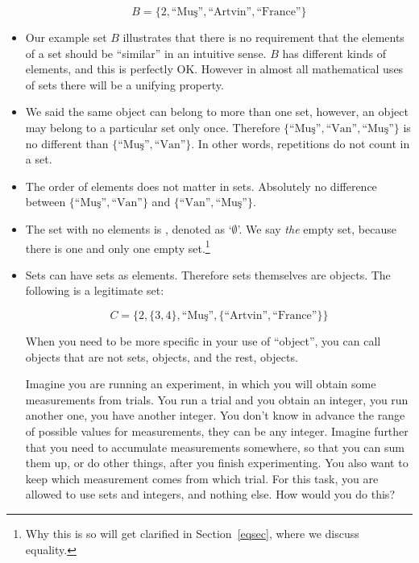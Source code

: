 \documentclass[11pt]{article}
\begin{document}
\begin{itemize}
\[
B=\{2,\text{``Mu\c s''},\text{``Artvin''}, \text{``France''}\}
\]

\item Our example set $B$ illustrates that there is no
requirement that the elements of a set should be ``similar'' in an intuitive
sense. $B$ has different kinds of elements, and this is perfectly OK. However in
almost all mathematical uses of sets there will be a unifying property. 

\item We said the same object can belong to more than one set, however, an
object may belong to a particular set only once. Therefore 
$\{\text{``Mu\c s''},\text{``Van''},\text{``Mu\c s''}\}$ is no different than
$\{\text{``Mu\c s''},\text{``Van''}\}$. In other words, repetitions do not count
in a set.

\item The order of elements does not matter in sets. Absolutely no difference between
$\{\text{``Mu\c s''},\text{``Van''}\}$ and $\{\text{``Van''},\text{``Mu\c
s''}\}$.

\item The set with no elements is , denoted as
`$\emptyset$'. We say \emph{the} empty set, because there is one and only one
empty set.\footnote{Why this is so will get clarified in Section~\ref{eqsec},
where we discuss equality.}

\item Sets can have sets as elements. Therefore sets themselves are objects.
The following is a legitimate set:


\[
C=\{2,\{3,4\},\text{``Mu\c s''},\{\text{``Artvin''}, \text{``France''}\}\}
\]

When you need to be more specific in your use of ``object'', you can call
objects that are not sets,  objects, and the rest,
 objects.

\hrulefill 
\begin{uexercise}\label{ex-part} Imagine you are running an
experiment, in which  you will obtain some measurements from trials. You run a
trial and you obtain an integer, you run another one, you have another integer.
You don't know in advance the range of possible values for
measurements, they can be any integer. Imagine further that you need to
accumulate measurements somewhere, so that you can sum them up, or do other
things, after you finish experimenting.  You also want to keep which measurement
comes from which trial. For this task, you are allowed to use sets and integers,
and nothing else.  How would you do this?  


\end{uexercise}
\end{itemize}
\end{document}
